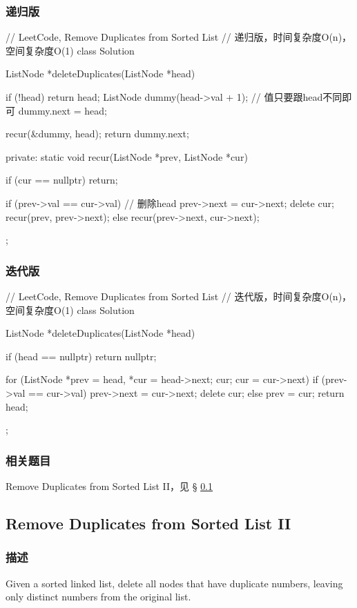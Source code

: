 \subsubsection{递归版}
\begin{Code}
	// LeetCode, Remove Duplicates from Sorted List
	// 递归版，时间复杂度O(n)，空间复杂度O(1)
	class Solution {
		ListNode *deleteDuplicates(ListNode *head) {
			if (!head) return head;
				ListNode dummy(head->val + 1); // 值只要跟head不同即可
			dummy.next = head;
			
			recur(&dummy, head);
			return dummy.next;
		}
		private:
		static void recur(ListNode *prev, ListNode *cur) {
			if (cur == nullptr) return;
			
			if (prev->val == cur->val) { // 删除head
				prev->next = cur->next;
				delete cur;
				recur(prev, prev->next);
			} else {
				recur(prev->next, cur->next);
			}
		}
	};
\end{Code}


\subsubsection{迭代版}
\begin{Code}
	// LeetCode, Remove Duplicates from Sorted List
	// 迭代版，时间复杂度O(n)，空间复杂度O(1)
	class Solution {
		ListNode *deleteDuplicates(ListNode *head) {
			if (head == nullptr) return nullptr;
			
			for (ListNode *prev = head, *cur = head->next; cur; cur = 
				cur->next) {
				if (prev->val == cur->val) {
					prev->next = cur->next;
					delete cur;
				} else {
					prev = cur;
				}
			}
			return head;
		}
	};
\end{Code}


\subsubsection{相关题目}

\begindot
\item Remove Duplicates from Sorted List II，见 \S 
\ref{sec:remove-duplicates-from-sorted-list-ii}
\myenddot


\subsection{Remove Duplicates from Sorted List II}
\label{sec:remove-duplicates-from-sorted-list-ii}


\subsubsection{描述}
Given a sorted linked list, delete all nodes that have duplicate numbers, 
leaving only distinct numbers from the original list.

